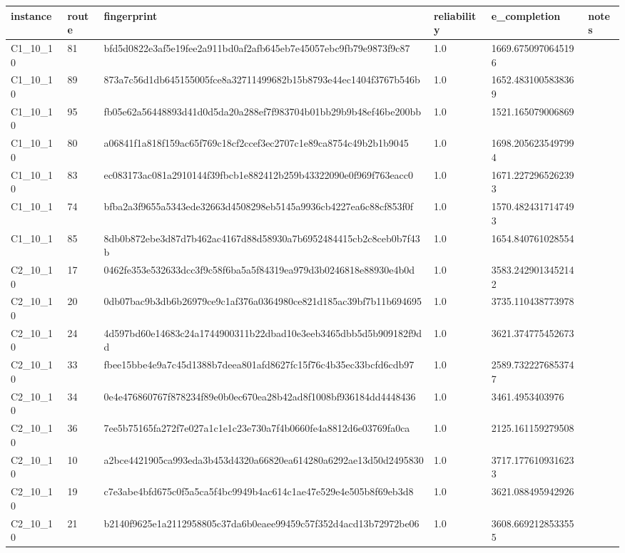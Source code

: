 \begin{tabular}{llllll}
 \hline
 instance & route & fingerprint & reliability & e\_completion & notes \\
 \hline
 C1\_10\_10 & 81 & bfd5d0822e3af5e19fee2a911bd0af2afb645eb7e45057ebc9fb79e9873f9c87 & 1.0 & 1669.6750970645196 &  \\
 C1\_10\_10 & 89 & 873a7c56d1db645155005fce8a32711499682b15b8793e44ec1404f3767b546b & 1.0 & 1652.4831005838369 &  \\
 C1\_10\_10 & 95 & fb05e62a56448893d41d0d5da20a288ef7f983704b01bb29b9b48ef46be200bb & 1.0 & 1521.165079006869 &  \\
 C1\_10\_10 & 80 & a06841f1a818f159ac65f769c18cf2ccef3ec2707c1e89ca8754c49b2b1b9045 & 1.0 & 1698.2056235497994 &  \\
 C1\_10\_10 & 83 & ec083173ac081a2910144f39fbcb1e882412b259b43322090e0f969f763eacc0 & 1.0 & 1671.2272965262393 &  \\
 C1\_10\_1 & 74 & bfba2a3f9655a5343ede32663d4508298eb5145a9936cb4227ea6c88cf853f0f & 1.0 & 1570.4824317147493 &  \\
 C1\_10\_1 & 85 & 8db0b872ebe3d87d7b462ac4167d88d58930a7b6952484415cb2c8ceb0b7f43b & 1.0 & 1654.840761028554 &  \\
 C2\_10\_10 & 17 & 0462fe353e532633dcc3f9c58f6ba5a5f84319ea979d3b0246818e88930e4b0d & 1.0 & 3583.2429013452142 &  \\
 C2\_10\_10 & 20 & 0db07bac9b3db6b26979ce9c1af376a0364980ce821d185ac39bf7b11b694695 & 1.0 & 3735.110438773978 &  \\
 C2\_10\_10 & 24 & 4d597bd60e14683c24a1744900311b22dbad10e3eeb3465dbb5d5b909182f9dd & 1.0 & 3621.374775452673 &  \\
 C2\_10\_10 & 33 & fbee15bbe4e9a7c45d1388b7deea801afd8627fc15f76c4b35ec33bcfd6cdb97 & 1.0 & 2589.7322276853747 &  \\
 C2\_10\_10 & 34 & 0e4e476860767f878234f89e0b0ec670ea28b42ad8f1008bf936184dd4448436 & 1.0 & 3461.4953403976 &  \\
 C2\_10\_10 & 36 & 7ee5b75165fa272f7e027a1c1e1c23e730a7f4b0660fe4a8812d6e03769fa0ca & 1.0 & 2125.161159279508 &  \\
 C2\_10\_10 & 10 & a2bce4421905ca993eda3b453d4320a66820ea614280a6292ae13d50d2495830 & 1.0 & 3717.1776109316233 &  \\
 C2\_10\_10 & 19 & c7e3abe4bfd675c0f5a5ca5f4bc9949b4ac614c1ae47e529e4e505b8f69eb3d8 & 1.0 & 3621.088495942926 &  \\
 C2\_10\_10 & 21 & b2140f9625e1a2112958805c37da6b0eaee99459c57f352d4acd13b72972be06 & 1.0 & 3608.6692128533555 &  \\

\end{tabular}
